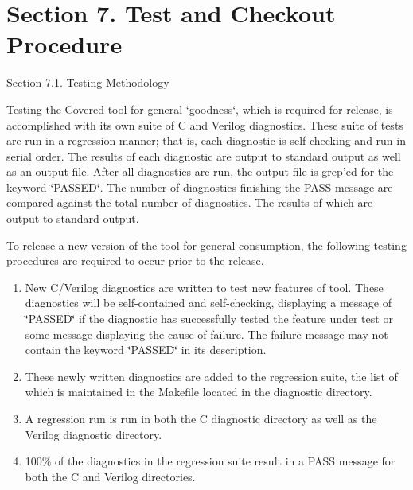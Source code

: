 \section{Section 7.  Test and Checkout Procedure}\label{page_testing}
 \begin{Desc}
\item[Section 7.1.  Testing Methodology]\par
 Testing the Covered tool for general \char`\"{}goodness\char`\"{}, which is required for release, is  accomplished with its own suite of C and Verilog diagnostics. These suite of tests are run  in a regression manner; that is, each diagnostic is self-checking and run in serial order.  The results of each diagnostic are output to standard output as well as an output file. After all diagnostics are run, the output file is grep'ed for the keyword \char`\"{}PASSED\char`\"{}. The number of diagnostics finishing the PASS message are compared against the total number of diagnostics. The results of which are output to standard output.

 To release a new version of the tool for general consumption, the following testing procedures are required to occur prior to the release.\begin{enumerate}
\item 
New C/Verilog diagnostics are written to test new features of tool. These diagnostics will be self-contained and self-checking, displaying a message of \char`\"{}PASSED\char`\"{} if the diagnostic has successfully tested the feature under test or some message displaying the cause of failure. The failure message may not contain the keyword \char`\"{}PASSED\char`\"{} in its description.\item 
These newly written diagnostics are added to the regression suite, the list of which is maintained in the Makefile located in the diagnostic directory.\item 
A regression run is run in both the C diagnostic directory as well as the Verilog diagnostic directory.\item 
100\% of the diagnostics in the regression suite result in a PASS message for both the C and Verilog directories.\end{enumerate}
\end{Desc}



